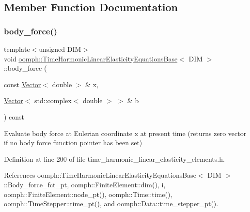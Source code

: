 \subsection{Member Function Documentation}
\mbox{\label{classoomph_1_1TimeHarmonicLinearElasticityEquationsBase_a18016f2870b5e0ef5462058fb7dd0b87}} 
\subsubsection{\texorpdfstring{body\+\_\+force()}{body\_force()}}
{\footnotesize\ttfamily template$<$unsigned D\+IM$>$ \\
void \hyperlink{classoomph_1_1TimeHarmonicLinearElasticityEquationsBase}{oomph\+::\+Time\+Harmonic\+Linear\+Elasticity\+Equations\+Base}$<$ D\+IM $>$\+::body\+\_\+force (\begin{DoxyParamCaption}\item[{const \hyperlink{classoomph_1_1Vector}{Vector}$<$ double $>$ \&}]{x,  }\item[{\hyperlink{classoomph_1_1Vector}{Vector}$<$ std\+::complex$<$ double $>$ $>$ \&}]{b }\end{DoxyParamCaption}) const\hspace{0.3cm}{\ttfamily [inline]}}



Evaluate body force at Eulerian coordinate x at present time (returns zero vector if no body force function pointer has been set) 



Definition at line 200 of file time\+\_\+harmonic\+\_\+linear\+\_\+elasticity\+\_\+elements.\+h.



References oomph\+::\+Time\+Harmonic\+Linear\+Elasticity\+Equations\+Base$<$ D\+I\+M $>$\+::\+Body\+\_\+force\+\_\+fct\+\_\+pt, oomph\+::\+Finite\+Element\+::dim(), i, oomph\+::\+Finite\+Element\+::node\+\_\+pt(), oomph\+::\+Time\+::time(), oomph\+::\+Time\+Stepper\+::time\+\_\+pt(), and oomph\+::\+Data\+::time\+\_\+stepper\+\_\+pt().

\mbox{\label{classoomph_1_1TimeHarmonicLinearElasticityEquationsBase_a73c637e0010ca0dfb8562a931bb5faf1}} 
